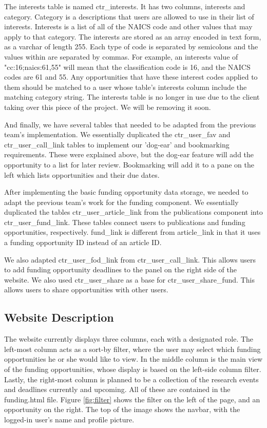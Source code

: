 \documentclass[onecolumn]{IEEEtran}
\begin{document}
The interests table is named ctr\_interests. It has two columns, interests and category. Category is a descriptions that users are allowed to use in their list of interests. Interests is a list of all of the NAICS code and other values that may apply to that category. The interests are stored as an array encoded in text form, as a varchar of length 255. Each type of code is separated by semicolons and the values within are separated by commas. For example, an interests value of "cc:16;naics:61,55" will mean that the classification code is 16, and the NAICS codes are 61 and 55. Any opportunities that have these interest codes applied to them should be matched to a user whose table's interests column include the matching category string. The interests table is no longer in use due to the client taking over this piece of the project. We will be removing it soon.

And finally, we have several tables that needed to be adapted from the previous team's implementation. We essentially duplicated the ctr\_user\_fav and ctr\_user\_call\_link tables to implement our 'dog-ear' and bookmarking requirements. These were explained above, but the dog-ear feature will add the opportunity to a list for later review. Bookmarking will add it to a pane on the left which lists opportunities and their due dates. 

After implementing the basic funding opportunity data storage, we needed to adapt the previous team's work for the funding component. We essentially duplicated the tables ctr\_user\_article\_link from the publications component into ctr\_user\_fund\_link. These tables connect users to publications and funding opportunities, respectively. fund\_link is different from article\_link in that it uses a funding opportunity ID instead of an article ID.

We also adapted ctr\_user\_fod\_link from ctr\_user\_call\_link. This allows users to add funding opportunity deadlines to the panel on the right side of the website. We also used ctr\_user\_share as a base for ctr\_user\_share\_fund. This allows users to share opportunities with other users.

\subsection{Website Description}
The website currently displays three columns, each with a designated role. The left-most column acts as a sort-by filter, where the user may select which funding opportunities he or she would like to view. In the middle column is the main view of the funding opportunities, whose display is based on the left-side column filter. Lastly, the right-most column is planned to be a collection of the research events and deadlines currently and upcoming. All of these are contained in the funding.html file. Figure \ref{fig:filter} shows the filter on the left of the page, and an opportunity on the right. The top of the image shows the navbar, with the logged-in user's name and profile picture. 
\end{document}
